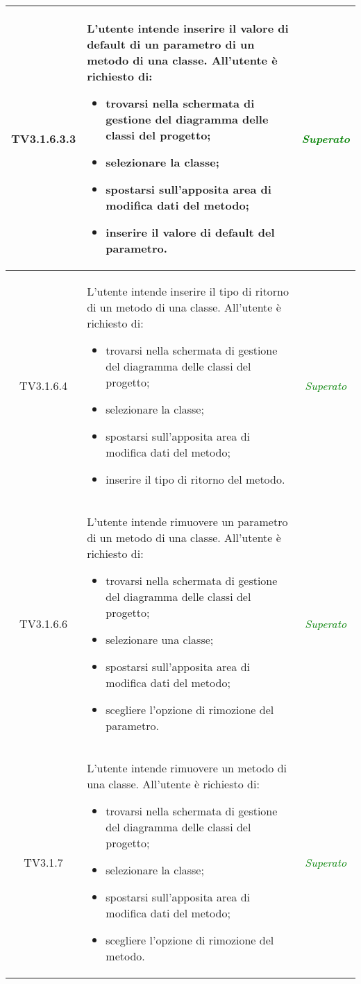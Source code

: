 \begin{longtable}{|c|>{}m{8cm}|c|}
\hypertarget{TV3.1.6.3.3}{TV3.1.6.3.3} & L'utente intende inserire il valore di default di un parametro di un metodo di una classe.
All'utente è richiesto di:
\begin{itemize}
	\item trovarsi nella schermata di gestione del diagramma delle classi del progetto;
	\item selezionare la classe;
	\item spostarsi sull'apposita area di modifica dati del metodo;
	\item inserire il valore di default del parametro.
\end{itemize} & \textcolor{Green}{\textit{Superato}}\\ \hline

\hypertarget{TV3.1.6.4}{TV3.1.6.4} & L'utente intende inserire il tipo di ritorno di un metodo di una classe.
All'utente è richiesto di:
\begin{itemize}
	\item trovarsi nella schermata di gestione del diagramma delle classi del progetto;
	\item selezionare la classe;
	\item spostarsi sull'apposita area di modifica dati del metodo;
	\item inserire il tipo di ritorno del metodo.
\end{itemize} & \textcolor{Green}{\textit{Superato}}\\ \hline

\hypertarget{TV3.1.6.6}{TV3.1.6.6} & L'utente intende rimuovere un parametro di un metodo di una classe.
All'utente è richiesto di:
\begin{itemize}
	\item trovarsi nella schermata di gestione del diagramma delle classi del progetto;
	\item selezionare una classe;
	\item spostarsi sull'apposita area di modifica dati del metodo;
	\item scegliere l'opzione di rimozione del parametro.
\end{itemize} & \textcolor{Green}{\textit{Superato}}\\ \hline

\hypertarget{TV3.1.7}{TV3.1.7} & L'utente intende rimuovere un metodo di una classe.
All'utente è richiesto di:
\begin{itemize}
	\item trovarsi nella schermata di gestione del diagramma delle classi del progetto;
	\item selezionare la classe;
	\item spostarsi sull'apposita area di modifica dati del metodo;
	\item scegliere l'opzione di rimozione del metodo.
\end{itemize} & \textcolor{Green}{\textit{Superato}}\\ \hline


\end{longtable}
